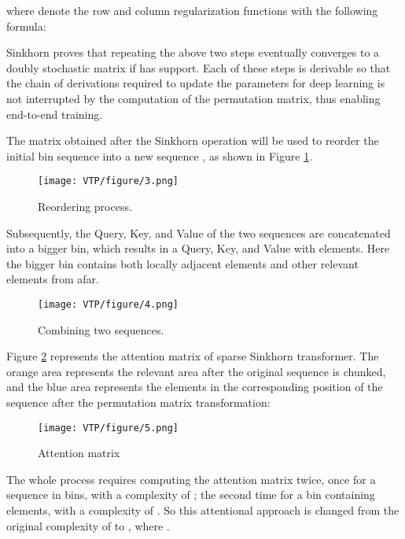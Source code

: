 \documentclass[lettersize,journal]{IEEEtran}
\begin{document}
where  denote the row and column regularization functions with the following formula:





\par Sinkhorn \cite{sinkhorn1964relationship} proves that repeating the above two steps eventually converges to a doubly stochastic matrix if  has support. Each of these steps is derivable so that the chain of derivations required to update the parameters for deep learning is not interrupted by the computation of the permutation matrix, thus enabling end-to-end training.


\par The matrix obtained after the Sinkhorn operation will be used to reorder the initial bin sequence  into a new sequence , as shown in Figure \ref{fig:reord_proc}.


\begin{figure}[h]
  \centering
  \texttt{[image: VTP/figure/3.png]}
  \caption{Reordering process.}
  \label{fig:reord_proc}
\end{figure}

\par Subsequently, the Query, Key, and Value of the two sequences are concatenated into a bigger bin, which results in a Query, Key, and Value with  elements. Here the bigger bin contains both locally adjacent elements and other relevant elements from afar.

\begin{figure}[h]
  \centering
  \texttt{[image: VTP/figure/4.png]}
  \caption{Combining two sequences.}
\end{figure}



\par Figure \ref{fig:attention_matrix} represents the attention matrix of sparse Sinkhorn transformer. The orange area represents the relevant area after the original sequence is chunked, and the blue area represents the elements in the corresponding position of the sequence after the permutation matrix transformation:

\begin{figure}[h]
  \centering
  \texttt{[image: VTP/figure/5.png]}
  \caption{Attention matrix \cite{fournier2021practical}}
  \label{fig:attention_matrix}
\end{figure}

\par The whole process requires computing the attention matrix twice, once for a sequence in bins, with a complexity of ; the second time for a bin containing  elements, with a complexity of . So this attentional approach is changed from the original
complexity of  to , where .
\end{document}

